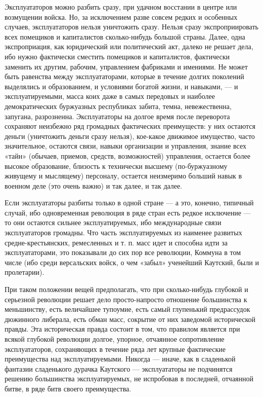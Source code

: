\documentclass[12pt]{article}
\newcommand{\parnum}{(\arabic{parcount})}
\newcounter{parcount}
\newenvironment{parnumbers}{%
  \par%
  \everypar{\noindent \stepcounter{parcount}\marginpar[]{\parnum}}%
}{}
\begin{document}
\begin{parnumbers}
Эксплуататоров можно разбить сразу, при удачном восстании в центре или возмущении войска. Но, за исключением разве совсем редких и особенных случаев, эксплуататоров нельзя уничтожить сразу. Нельзя сразу экспроприировать всех помещиков и капиталистов сколько-нибудь большой страны. Далее, одна экспроприация, как юридический или политический акт, далеко не решает дела, ибо нужно фактически сместить помещиков и капиталистов, фактически заменить их другим, рабочим, управлением фабриками и имениями. Не может быть равенства между эксплуататорами, которые в течение долгих поколений выделялись и образованием, и условиями богатой жизни, и навыками, — и эксплуатируемыми, масса коих даже в самых передовых и наиболее демократических буржуазных республиках забита, темна, невежественна, запугана, разрозненна. Эксплуататоры на долгое время после переворота сохраняют неизбежно ряд громадных фактических преимуществ: у них остаются деньги (уничтожить деньги сразу нельзя), кое-какое движимое имущество, часто значительное, остаются связи, навыки организации и управления, знание всех «тайн» (обычаев, приемов, средств, возможностей) управления, остается более высокое образование, близость к технически высшему (по-буржуазному живущему и мыслящему) персоналу, остается неизмеримо больший навык в военном деле (это очень важно) и так далее, и так далее.

Если эксплуататоры разбиты только в одной стране — а это, конечно, типичный случай, ибо одновременная революция в ряде стран есть редкое исключение — то они остаются сильнее эксплуатируемых, ибо международные связи эксплуататоров громадны. Что часть эксплуатируемых из наименее развитых средне-крестьянских, ремесленных и т. п. масс идет и способна идти за эксплуататорами, это показывали до сих пор все революции, Коммуна в том числе (ибо среди версальских войск, о чем «забыл» ученейший Каутский, были и пролетарии).

При таком положении вещей предполагать, что при сколько-нибудь глубокой и серьезной революции решает дело просто-напросто отношение большинства к меньшинству, есть величайшее тупоумие, есть самый глупенький предрассудок дюжинного либерала, есть обман масс, сокрытие от них заведомой исторической правды. Эта историческая правда состоит в том, что правилом является при всякой глубокой революции долгое, упорное, отчаянное сопротивление эксплуататоров, сохраняющих в течение ряда лет крупные фактические преимущества над эксплуатируемыми. Никогда — иначе, как в сладенькой фантазии сладенького дурачка Каутского — эксплуататоры не подчинятся решению большинства эксплуатируемых, не испробовав в последней, отчаянной битве, в ряде битв своего преимущества.


\end{parnumbers}
\end{document}
